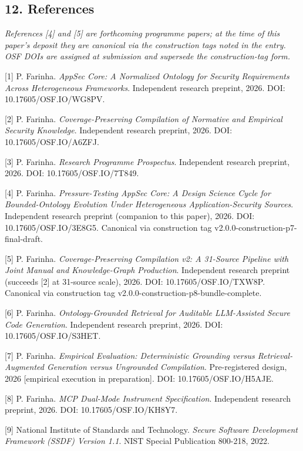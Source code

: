 \documentclass[
]{article}
\begin{document}
\subsection{12. References}\label{references}

\emph{References {[}4{]} and {[}5{]} are forthcoming programme papers;
at the time of this paper's deposit they are canonical via the
construction tags noted in the entry. OSF DOIs are assigned at
submission and supersede the construction-tag form.}

{[}1{]} P. Farinha. \emph{AppSec Core: A Normalized Ontology for
Security Requirements Across Heterogeneous Frameworks}. Independent
research preprint, 2026. DOI: 10.17605/OSF.IO/WG8PV.

{[}2{]} P. Farinha. \emph{Coverage-Preserving Compilation of Normative
and Empirical Security Knowledge}. Independent research preprint, 2026.
DOI: 10.17605/OSF.IO/A6ZFJ.

{[}3{]} P. Farinha. \emph{Research Programme Prospectus}. Independent
research preprint, 2026. DOI: 10.17605/OSF.IO/7T849.

{[}4{]} P. Farinha. \emph{Pressure-Testing AppSec Core: A Design Science
Cycle for Bounded-Ontology Evolution Under Heterogeneous
Application-Security Sources}. Independent research preprint (companion
to this paper), 2026. DOI: 10.17605/OSF.IO/3E8G5. Canonical via
construction tag v2.0.0-construction-p7-final-draft.

{[}5{]} P. Farinha. \emph{Coverage-Preserving Compilation v2: A
31-Source Pipeline with Joint Manual and Knowledge-Graph Production}.
Independent research preprint (succeeds {[}2{]} at 31-source scale),
2026. DOI: 10.17605/OSF.IO/TXW8P. Canonical via construction tag
v2.0.0-construction-p8-bundle-complete.

{[}6{]} P. Farinha. \emph{Ontology-Grounded Retrieval for Auditable
LLM-Assisted Secure Code Generation}. Independent research preprint,
2026. DOI: 10.17605/OSF.IO/S3HET.

{[}7{]} P. Farinha. \emph{Empirical Evaluation: Deterministic Grounding
versus Retrieval-Augmented Generation versus Ungrounded Compilation}.
Pre-registered design, 2026 {[}empirical execution in preparation{]}.
DOI: 10.17605/OSF.IO/H5AJE.

{[}8{]} P. Farinha. \emph{MCP Dual-Mode Instrument Specification}.
Independent research preprint, 2026. DOI: 10.17605/OSF.IO/KH8Y7.

{[}9{]} National Institute of Standards and Technology. \emph{Secure
Software Development Framework (SSDF) Version 1.1}. NIST Special
Publication 800-218, 2022.
\end{document}
